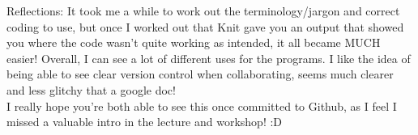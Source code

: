 \documentclass[
]{article}
\begin{document}
Reflections: It took me a while to work out the terminology/jargon and
correct coding to use, but once I worked out that Knit gave you an
output that showed you where the code wasn't quite working as intended,
it all became MUCH easier! Overall, I can see a lot of different uses
for the programs. I like the idea of being able to see clear version
control when collaborating, seems much clearer and less glitchy that a
google doc!\\
I really hope you're both able to see this once committed to Github, as
I feel I missed a valuable intro in the lecture and workshop! :D
\end{document}
